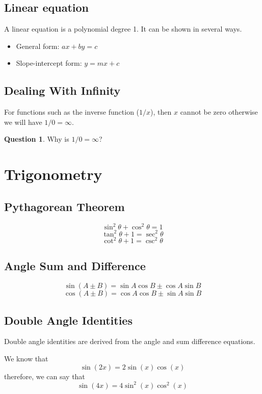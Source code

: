 \documentclass[a4paper]{article}
\theoremstyle{plain}
\theoremstyle{definition}
\newtheorem{question}{Question}[section]
\theoremstyle{remark}
\newcommand{\sectionSpace}{\vspace{2em}} %
\newcommand{\subsectionSpace}{\vspace{0.5em}}
\begin{document}
    \subsection{Linear equation}
    A linear equation is a polynomial degree 1. It can be shown in several ways.
    \begin{itemize}
        \item General form: $ax + by = c$
        \item Slope-intercept form: $y = mx + c$
    \end{itemize}

    \subsectionSpace
    \subsection{Dealing With Infinity}
    For functions such as the inverse function ($1/x$), then $x$ cannot be zero otherwise we will have $1/0 = \infty$. 
    \begin{question}
        Why is $1/0 = \infty$?
    \end{question}


\sectionSpace
\section{Trigonometry}
    \subsection{Pythagorean Theorem}
    \[\sin^2\theta + \cos^2\theta= 1\]
    \[\tan^2\theta + 1 = \sec^2\theta\]
    \[\cot^2\theta + 1 = \csc^2\theta\]

    \subsectionSpace
    \subsection{Angle Sum and Difference}
    $$\sin(A \pm B) = \sin A \cos B \pm \cos A \sin B$$
    $$\cos(A \pm B) = \cos A \cos B \pm \sin A \sin B$$

    \subsectionSpace
    \subsection{Double Angle Identities}
    Double angle identities are derived from the angle and sum difference equations. 

    We know that
    $$\sin(2x) = 2\sin(x)\cos(x)$$
    therefore, we can say that
    $$\sin(4x) = 4\sin^2(x)\cos^2(x)$$

    \subsectionSpace
\end{document}
